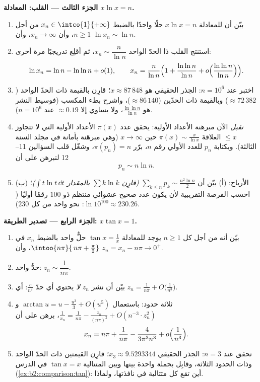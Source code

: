 \begin{problem}
\medskip
\noindent\textbf{الجزء الثالث --- القلب: المعادلة $x\ln x =
n$.}
\begin{enumerate}[resume]
  \item بيّن أن للمعادلة $x\ln x = n$ حلًا واحدًا بالضبط $x_n \in
        \intco{1}{+\infty}$ من أجل $n \geq 1$، وأن $x_n \to
        \infty$، وأن $\ln x_n \sim \ln n$.
  \item استنتج القلب ذا الحدّ الواحد $x_n \sim
        \dfrac{n}{\ln n}$، ثم أقلِع تدريجيًا مرة أخرى:
        \[
        \ln x_n = \ln n - \ln\ln n + o(1),
        \qquad
        x_n = \frac{n}{\ln n}\Bigl(1 + \frac{\ln\ln n}{\ln n}
        + o\Bigl(\frac{\ln\ln n}{\ln n}\Bigr)\Bigr).
        \]
  \item اختبر عند $n = 10^6$: الجذر الحقيقي هو $x \approx
        87\,848$؛ قارِن بالقيمة ذات الحدّ الواحد ($\approx 72\,382$)
        وبالقيمة ذات الحدّين ($\approx 86\,140$)، واشرح
        بطء المكسب (فوسيط النشر هو $\frac{\ln\ln
        n}{\ln n}$، ولا يساوي إلا $\approx 0.19$ عند $n = 10^6$).
  \item \emph{نقبل} الآن مبرهنة الأعداد الأولية: يحقق عدد
        $\pi(x)$ الأعداد الأولية التي لا تتجاوز $\leq x$ العلاقةَ $\pi(x) \sim
        \frac{x}{\ln x}$ حين $x \to \infty$ (وهي مبرهَنة بأمانة في
        مجلد السنة الثالثة). وبكتابة $p_n$ للعدد الأولي رقم $n$،
        برّر $\pi(p_n) = n$، وشغّل قلب
        السؤالين 11--12 لتبرهن على أن
        \[
        p_n \sim n \ln n .
        \]
  \item الأرباح: (أ) بيّن أن $\sum_{k \leq n} p_k \sim
        \frac{n^2\ln n}{2}$ \emph{(قارِن $\sum k\ln k$ بالمقدار
        $\int t\ln t\,\dd t$)}؛ (ب) احسب الفرصة التقريبية
        لأن يكون عدد صحيح عشوائي منتظم ذو $100$
        رقمًا أوليًا ($\ln 10^{100} \approx 230.26$: نحو
        واحد من كل $230$).
\end{enumerate}

\medskip
\noindent\textbf{الجزء الرابع --- تصدير الطريقة: $x\tan x =
1$.}
\begin{enumerate}[resume]
  \item بيّن أنه من أجل كل $n \geq 1$ يوجد للمعادلة $\tan x =
        \frac1x$ حلٌّ واحد بالضبط $x_n$ في
        $\intoo{n\pi}{\,n\pi + \frac\pi2}$، وأن $z_n = x_n
        - n\pi \to 0^+$.
  \item حدٌّ واحد: $z_n \sim \dfrac{1}{n\pi}$.
  \item بيّن أن نشر $z_n$ \emph{لا} يحتوي أي حدّ
        $\frac{c}{n^2}$: أي $z_n = \frac1{n\pi} +
        O\bigl(\frac{1}{n^3}\bigr)$.
  \item ثلاثة حدود: باستعمال $\arctan u = u - \frac{u^3}3 +
        O(u^5)$ و$\frac1{x_n} = \frac{1}{n\pi} -
        \frac{z_n}{(n\pi)^2} + O(n^{-3}\cdot z_n^2)$، برهن على أن
        \[
        x_n = n\pi + \frac{1}{n\pi} -
        \frac{4}{3\pi^3 n^3} + o\Bigl(\frac{1}{n^3}\Bigr).
        \]
  \item تحقق عند $n = 3$: الجذر الحقيقي $x_3 \approx 9.5293344$؛
        قارِن القيمتين ذات الحدّ الواحد وذات الحدود الثلاثة، وقابِل
        بجملة واحدة بينها وبين المتتالية $\tan x = x$ في الدرس
        (\cref{ex:b2:comparison:tan}): أين تقع كل متتالية
        في نافذتها، ولماذا.
\end{enumerate}


\end{problem}

